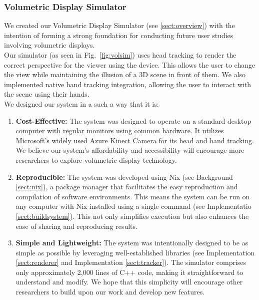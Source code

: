 \subsubsection{Volumetric Display Simulator}
We created our Volumetric Display Simulator (see \ref{sect:overview}) with the intention of forming a strong foundation for conducting future user studies involving volumetric displays. \\

Our simulator (as seen in Fig.~\ref{fig:volsim}) uses head tracking to render the correct perspective for the viewer using the device. This allows the user to change the view while maintaining the illusion of a 3D scene in front of them. We also implemented native hand tracking integration, allowing the user to interact with the scene using their hands. \\

We designed our system in a such a way that it is: 

\begin{enumerate}
    \item \textbf{Cost-Effective:} The system was designed to operate on a standard desktop computer with regular monitors using common hardware. It utilizes Microsoft's widely used Azure Kinect Camera for its head and hand tracking. We believe our system's affordability and accessibility will encourage more researchers to explore volumetric display technology.

    \item \textbf{Reproducible:} The system was developed using Nix (see Background \ref{sect:nix}), a package manager that facilitates the easy reproduction and compilation of software environments. This means the system can be run on any computer with Nix installed using a single command (see Implementatio \ref{sect:buildsystem}). This not only simplifies execution but also enhances the ease of sharing and reproducing results.

    \item \textbf{Simple and Lightweight:} The system was intentionally designed to be as simple as possible by leveraging well-established libraries (see Implementation \ref{sect:renderer} and Implementation \ref{sect:tracker}). The simulator comprises only approximately 2,000 lines of C++ code, making it straightforward to understand and modify. We hope that this simplicity will encourage other researchers to build upon our work and develop new features.
\end{enumerate}

